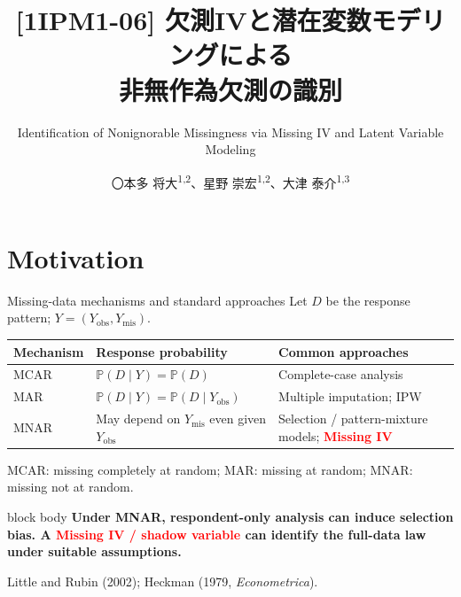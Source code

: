 \documentclass[aspectratio=169,10pt]{beamer}
\title{[1IPM1-06] 欠測IVと潜在変数モデリングによる\\非無作為欠測の識別}
\subtitle{Identification of Nonignorable Missingness via Missing IV and Latent Variable Modeling}
\author{〇本多 将大\textsuperscript{1,2}、星野 崇宏\textsuperscript{1,2}、大津 泰介\textsuperscript{1,3}}
\institute{1. 慶應義塾大学、2. 理化学研究所、3. London School of Economics and Political Science}
\date{}
\newcommand{\slideannotation}{\fontsize{8pt}{9.6pt}\selectfont}
\renewcommand{\arraystretch}{1.14}
\newcommand{\Prb}{\mathbb P}
\newcommand{\redkey}[1]{\textcolor{Red}{\textbf{#1}}}
\newenvironment{takeaway}{%
  \begin{beamercolorbox}[rounded=true,sep=.7em,wd=\linewidth]{block body}%
  \color{Navy}\bfseries}{\end{beamercolorbox}}
\begin{document}
\begin{frame}[plain]
\vspace{1.35cm}
\titlepage
\end{frame}

\section{Motivation}
\begin{frame}{Missing-data mechanisms and standard approaches}
Let $D$ be the response pattern; $Y=(Y_{\mathrm{obs}},Y_{\mathrm{mis}})$.
\smallskip
\renewcommand{\arraystretch}{1.05}
\begin{tabular}{@{}p{.19\linewidth}p{.40\linewidth}p{.36\linewidth}@{}}
\toprule
Mechanism & Response probability & Common approaches\\
\midrule
MCAR & $\Prb(D\mid Y)=\Prb(D)$ & Complete-case analysis\\[.5em]
MAR & $\Prb(D\mid Y)=\Prb(D\mid Y_{\mathrm{obs}})$ & Multiple imputation; IPW\\[.5em]
MNAR & May depend on $Y_{\mathrm{mis}}$ even given $Y_{\mathrm{obs}}$ & Selection / pattern-mixture models; \redkey{Missing IV}\\
\bottomrule
\end{tabular}
\medskip
MCAR: missing completely at random; MAR: missing at random; MNAR: missing not at random.\vspace{-1pt}
\begin{takeaway}
Under MNAR, respondent-only analysis can induce selection bias. A \redkey{Missing IV / shadow variable} can identify the full-data law under suitable assumptions.
\end{takeaway}
{\slideannotation Little and Rubin (2002); Heckman (1979, \emph{Econometrica}).}
\end{frame}
\end{document}
